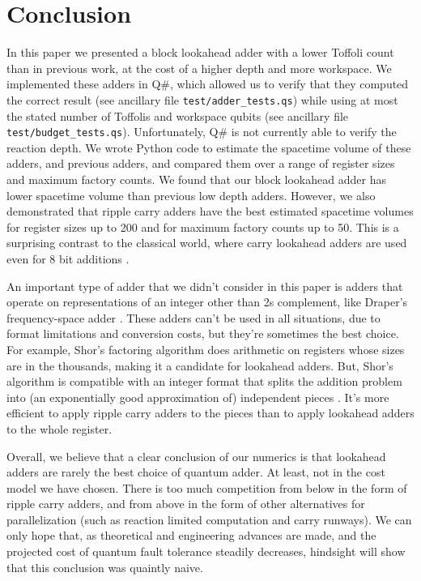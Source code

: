 \documentclass[onecolumn,unpublished]{quantumarticle}
\theoremstyle{definition}
\theoremstyle{definition}
\theoremstyle{definition}
\begin{document}
\section{Conclusion}
\label{sec:conclusion}

In this paper we presented a block lookahead adder with a lower Toffoli count than in previous work, at the cost of a higher depth and more workspace.
We implemented these adders in Q\#, which allowed us to verify that they computed the correct result (see ancillary file \texttt{test/adder\_tests.qs}) while using at most the stated number of Toffolis and workspace qubits (see ancillary file \\\texttt{test/budget\_tests.qs}).
Unfortunately, Q\# is not currently able to verify the reaction depth.
We wrote Python code to estimate the spacetime volume of these adders, and previous adders, and compared them over a range of register sizes and maximum factory counts.
We found that our block lookahead adder has lower spacetime volume than previous low depth adders.
However, we also demonstrated that ripple carry adders have the best estimated spacetime volumes for register sizes up to 200 and for maximum factory counts up to 50.
This is a surprising contrast to the classical world, where carry lookahead adders are used even for 8 bit additions \cite{shirriff2020reverseengineer8008}.

An important type of adder that we didn't consider in this paper is adders that operate on representations of an integer other than 2s complement, like Draper's frequency-space adder \cite{draper2000qftaddition}.
These adders can't be used in all situations, due to format limitations and conversion costs, but they're sometimes the best choice.
For example, Shor's factoring algorithm \cite{shor1994algorithms} does arithmetic on registers whose sizes are in the thousands, making it a candidate for lookahead adders.
But, Shor's algorithm is compatible with an integer format that splits the addition problem into (an exponentially good approximation of) independent pieces \cite{gidney2019approximate,gidney2019factor}.
It's more efficient to apply ripple carry adders to the pieces than to apply lookahead adders to the whole register.

Overall, we believe that a clear conclusion of our numerics is that lookahead adders are rarely the best choice of quantum adder.
At least, not in the cost model we have chosen.
There is too much competition from below in the form of ripple carry adders, and from above in the form of other alternatives for parallelization (such as reaction limited computation and carry runways).
We can only hope that, as theoretical and engineering advances are made, and the projected cost of quantum fault tolerance steadily decreases, hindsight will show that this conclusion was quaintly naive.
\end{document}
